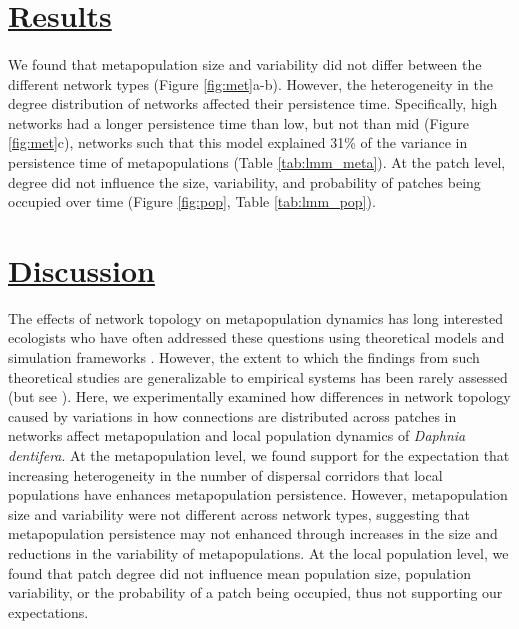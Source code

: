 \section*{\textbf{\underline{Results}}}

\paragraph*{}
We found that metapopulation size and variability did not differ between the different network types (Figure \ref{fig:met}a-b). However, the heterogeneity in the degree distribution of networks affected their persistence time. Specifically, high networks had a longer persistence time than low, but not than mid (Figure \ref{fig:met}c), networks such that this model explained 31\% of the variance in persistence time of metapopulations (Table \ref{tab:lmm_meta}). At the patch level, degree did not influence the size, variability, and probability of patches being occupied over time (Figure \ref{fig:pop}, Table \ref{tab:lmm_pop}). 





\section*{\textbf{\underline{Discussion}}}
The effects of network topology on metapopulation dynamics has long interested ecologists who have often addressed these questions using theoretical models and simulation frameworks \parencite{artzy2010,gilarranz2012,grilli2015}. However, the extent to which the findings from such theoretical studies are generalizable to empirical systems has been rarely assessed (but see \textcite{arancibia2021, arancibia2024}). Here, we experimentally examined how differences in network topology caused by variations in how connections are distributed across patches in networks affect metapopulation and local population dynamics of \textit{Daphnia dentifera}. At the metapopulation level, we found support for the expectation that increasing heterogeneity in the number of dispersal corridors that local populations have enhances metapopulation persistence. However, metapopulation size and variability were not different across network types, suggesting that metapopulation persistence may not enhanced through increases in the size and reductions in the variability of metapopulations. At the local population level, we found that patch degree did not influence mean population size, population variability, or the probability of a patch being occupied, thus not supporting our expectations. %

